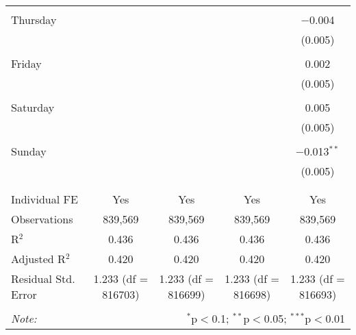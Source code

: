 \documentclass[
]{article}
\begin{document}
\begin{table}[!htbp]
{\begin{tabular}{@{\extracolsep{5pt}}lcccc}
  & & & & \\ 
 Thursday &  &  &  & $-$0.004 \\ 
  &  &  &  & (0.005) \\ 
  & & & & \\ 
 Friday &  &  &  & 0.002 \\ 
  &  &  &  & (0.005) \\ 
  & & & & \\ 
 Saturday &  &  &  & 0.005 \\ 
  &  &  &  & (0.005) \\ 
  & & & & \\ 
 Sunday &  &  &  & $-$0.013$^{**}$ \\ 
  &  &  &  & (0.005) \\ 
  & & & & \\ 
\hline \\[-1.8ex] 
Individual FE & Yes & Yes & Yes & Yes \\ 
Observations & 839,569 & 839,569 & 839,569 & 839,569 \\ 
R$^{2}$ & 0.436 & 0.436 & 0.436 & 0.436 \\ 
Adjusted R$^{2}$ & 0.420 & 0.420 & 0.420 & 0.420 \\ 
Residual Std. Error & 1.233 (df = 816703) & 1.233 (df = 816699) & 1.233 (df = 816698) & 1.233 (df = 816693) \\ 
\hline 
\hline \\[-1.8ex] 
\textit{Note:}  & \multicolumn{4}{r}{$^{*}$p$<$0.1; $^{**}$p$<$0.05; $^{***}$p$<$0.01} \\ 
\end{tabular}
} 
\end{table} 
\newpage
\end{document}
